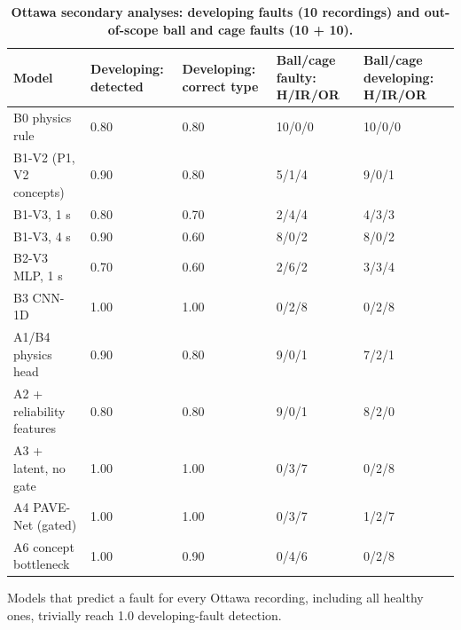 \begin{table}[!ht]
\centering
\caption{\textbf{Ottawa secondary analyses: developing faults (10 recordings) and out-of-scope ball and cage faults (10 + 10).}}
{\footnotesize
\begin{tabular}{|l|p{2.2cm}|p{2.2cm}|p{2.6cm}|p{2.6cm}|}
\hline
Model & Developing: detected & Developing: correct type & Ball/cage faulty: H/IR/OR & Ball/cage developing: H/IR/OR \\ \hline
B0 physics rule & 0.80 & 0.80 & 10/0/0 & 10/0/0 \\ \hline
B1-V2 (P1, V2 concepts) & 0.90 & 0.80 & 5/1/4 & 9/0/1 \\ \hline
B1-V3, 1 s & 0.80 & 0.70 & 2/4/4 & 4/3/3 \\ \hline
B1-V3, 4 s & 0.90 & 0.60 & 8/0/2 & 8/0/2 \\ \hline
B2-V3 MLP, 1 s & 0.70 & 0.60 & 2/6/2 & 3/3/4 \\ \hline
B3 CNN-1D & 1.00 & 1.00 & 0/2/8 & 0/2/8 \\ \hline
A1/B4 physics head & 0.90 & 0.80 & 9/0/1 & 7/2/1 \\ \hline
A2 + reliability features & 0.80 & 0.80 & 9/0/1 & 8/2/0 \\ \hline
A3 + latent, no gate & 1.00 & 1.00 & 0/3/7 & 0/2/8 \\ \hline
A4 PAVE-Net (gated) & 1.00 & 1.00 & 0/3/7 & 1/2/7 \\ \hline
A6 concept bottleneck & 1.00 & 0.90 & 0/4/6 & 0/2/8 \\ \hline
\end{tabular}}
\begin{flushleft} Models that predict a fault for every Ottawa recording, including all healthy ones, trivially reach 1.0 developing-fault detection. \end{flushleft}
\label{tab:extsec}
\end{table}